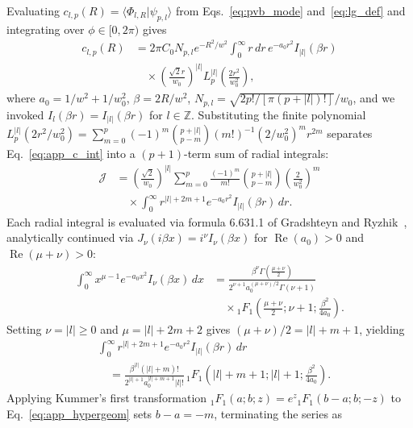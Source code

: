 \documentclass[aps,pra,onecolumn,notitlepage,11pt,tightenlines,amsmath,amssymb,floatfix,longbibliography]{revtex4-2}
\providecommand{\braket}[2]{\langle#1\vert#2\rangle}
\providecommand{\abs}[1]{\lvert#1\rvert}
\begin{document}
Evaluating $c_{l,p}(R) = \braket{\Phi_{l,R}}{\psi_{p,l}}$ from Eqs.~\eqref{eq:pvb_mode} and~\eqref{eq:lg_def} and integrating over $\phi \in [0,2\pi)$ gives
\begin{align}
c_{l,p}(R) &= 2\pi C_0 N_{p,l} e^{-R^2/w^2} \int_0^\infty r\,dr\, e^{-a_0 r^2} I_{\abs{l}}(\beta r) \nonumber \\
&\quad \times \left(\frac{\sqrt{2}r}{w_0}\right)^{\abs{l}} L_p^{\abs{l}}\!\left(\frac{2r^2}{w_0^2}\right),
\label{eq:app_c_int}
\end{align}
where $a_0 = 1/w^2 + 1/w_0^2$, $\beta = 2R/w^2$, $N_{p,l} = \sqrt{2p!/[\pi(p+\abs{l})!]}/w_0$, and we invoked $I_l(\beta r) = I_{\abs{l}}(\beta r)$ for $l \in \mathbb{Z}$. Substituting the finite polynomial $L_p^{\abs{l}}(2r^2/w_0^2) = \sum_{m=0}^p (-1)^m \binom{p+\abs{l}}{p-m} (m!)^{-1} (2/w_0^2)^m r^{2m}$ separates Eq.~\eqref{eq:app_c_int} into a $(p+1)$-term sum of radial integrals:
\begin{align}
\mathcal{J} &= \left(\frac{\sqrt{2}}{w_0}\right)^{\abs{l}} \sum_{m=0}^p \frac{(-1)^m}{m!}\binom{p+\abs{l}}{p-m}\left(\frac{2}{w_0^2}\right)^m \nonumber \\
&\quad \times \int_0^\infty r^{\abs{l}+2m+1} e^{-a_0 r^2} I_{\abs{l}}(\beta r)\,dr.
\label{eq:app_J_sum}
\end{align}
Each radial integral is evaluated via formula 6.631.1 of Gradshteyn and Ryzhik~\cite{Gradshteyn2014}, analytically continued via $J_\nu(i\beta x) = i^\nu I_\nu(\beta x)$ for $\operatorname{Re}(a_0) > 0$ and $\operatorname{Re}(\mu+\nu) > 0$:
\begin{align*}
\int_0^\infty x^{\mu-1} e^{-a_0 x^2} I_\nu(\beta x)\,dx &= \frac{\beta^\nu \Gamma\left(\frac{\mu+\nu}{2}\right)}{2^{\nu+1} a_0^{(\mu+\nu)/2} \Gamma(\nu+1)} \\
&\quad \times {_1F_1}\!\left(\frac{\mu+\nu}{2}; \nu+1; \frac{\beta^2}{4a_0}\right).
\end{align*}
Setting $\nu = \abs{l} \ge 0$ and $\mu = \abs{l} + 2m + 2$ gives $(\mu+\nu)/2 = \abs{l} + m + 1$, yielding
\begin{align}
&\int_0^\infty r^{\abs{l}+2m+1} e^{-a_0 r^2} I_{\abs{l}}(\beta r)\,dr \nonumber \\
&\quad = \frac{\beta^{\abs{l}}(\abs{l}+m)!}{2^{\abs{l}+1} a_0^{\abs{l}+m+1}\abs{l}!}\,{_1F_1}\!\left(\abs{l}+m+1; \abs{l}+1; \frac{\beta^2}{4a_0}\right).
\label{eq:app_hypergeom}
\end{align}
Applying Kummer's first transformation ${_1F_1}(a;b;z) = e^z {_1F_1}(b-a;b;-z)$ to Eq.~\eqref{eq:app_hypergeom} sets $b - a = -m$, terminating the series as
\end{document}
